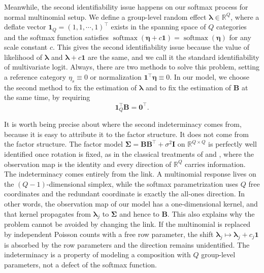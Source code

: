 Meanwhile, the second identifiability issue happens on our softmax process for normal multinomial setup. We define a group-level random effect $\bm{\lambda}\in \mathbb{R}^{Q}$, where a deflate vector $\mathbf{1}_{Q}=\left(1,1,\cdots,1\right)^{\top}$ exists in the spanning space of $Q$ categories and the softmax function satisfies $\operatorname{softmax}\left(\bm{\eta}+c\mathbf{1}\right)=\operatorname{softmax}\left(\bm{\eta}\right)$ for any scale constant $c$. This gives the second identifiability issue because the value of likelihood of $\bm{\lambda}$ and $\bm{\lambda}+c\mathbf{1}$ are the same, and we call it the standard identifiability of multivariate logit. Always, there are two methods to solve this problem, setting a reference category $\eta_{s}\equiv0$ or normalization $\mathbf{1}^{\top}\bm{\eta}\equiv0$. In our model, we choose the second method to fix the estimation of $\bm{\lambda}$ and to fix the estimation of $\mathbf{B}$ at the same time, by requiring
\begin{equation}
    \mathbf{1}_{Q}^{\top}\mathbf{B}=\mathbf{0}^{\top} .
    \label{eq:gauge-constraint}
\end{equation}

It is worth being precise about where the second indeterminacy comes from, because it is easy to attribute it to the factor structure. It does not come from the factor structure. The factor model $\bm{\Sigma}=\mathbf{B}\mathbf{B}^{\top}+\sigma^{2}\mathbf{I}$ on $\mathbb{R}^{Q\times Q}$ is perfectly well identified once rotation is fixed, as in the classical treatments of \citet{Rubin1982} and \citet{Tipping1999}, where the observation map is the identity and every direction of $\mathbb{R}^{Q}$ carries information. The indeterminacy comes entirely from the link. A multinomial response lives on the $(Q-1)$-dimensional simplex, while the softmax parametrization uses $Q$ free coordinates and the redundant coordinate is exactly the all-ones direction. In other words, the observation map of our model has a one-dimensional kernel, and that kernel propagates from $\bm{\lambda}_{j}$ to $\bm{\Sigma}$ and hence to $\mathbf{B}$. This also explains why the problem cannot be avoided by changing the link. If the multinomial is replaced by independent Poisson counts with a free row parameter, the shift $\bm{\lambda}_{j}\mapsto\bm{\lambda}_{j}+c_{j}\mathbf{1}$ is absorbed by the row parameters and the direction remains unidentified. The indeterminacy is a property of modeling a composition with $Q$ group-level parameters, not a defect of the softmax function.

